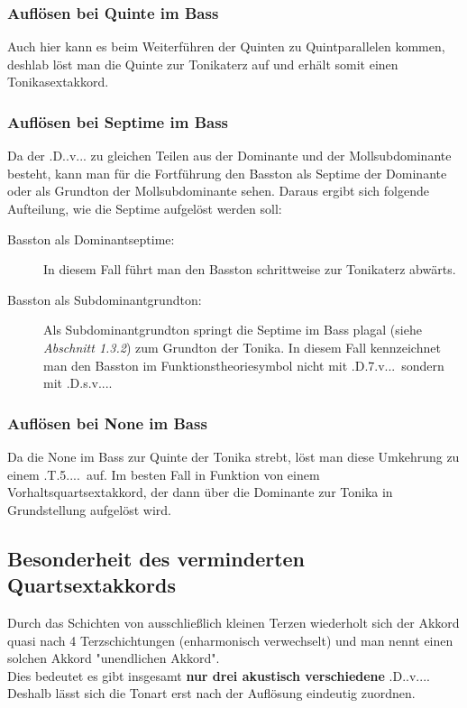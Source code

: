 \documentclass[a4paper]{article}
\newcommand{\TQS}{\HH.T.5....}
\newcommand{\Dhoch}[2]{\HH.D.#2.#1...}
\begin{document}
	\subsubsection{Auflösen bei Quinte im Bass}
	Auch hier kann es beim Weiterführen der Quinten zu Quintparallelen kommen, deshlab löst man die Quinte zur Tonikaterz auf und erhält somit einen Tonikasextakkord.
	
	\subsubsection{Auflösen bei Septime im Bass}
	Da der \Dhoch{v}{} zu gleichen Teilen aus der Dominante und der Mollsubdominante besteht, kann man für die Fortführung den Basston als Septime der Dominante oder als Grundton der Mollsubdominante sehen. Daraus ergibt sich folgende Aufteilung, wie die Septime aufgelöst werden soll:
	\begin{description}
		\item[Basston als Dominantseptime:] In diesem Fall führt man den Basston schrittweise zur Tonikaterz abwärts.
		\item[Basston als Subdominantgrundton:] Als Subdominantgrundton springt die Septime im Bass plagal (siehe \textit{Abschnitt 1.3.2}) zum Grundton der Tonika. In diesem Fall kennzeichnet man den Basston im Funktionstheoriesymbol nicht mit \Dhoch{v}{7}\ sondern mit \Dhoch{v}{s}.
	\end{description}

	\subsubsection{Auflösen bei None im Bass}
	Da die None im Bass zur Quinte der Tonika strebt, löst man diese Umkehrung zu einem \TQS\ auf. Im besten Fall in Funktion von einem Vorhaltsquartsextakkord, der dann über die Dominante zur Tonika in Grundstellung aufgelöst wird.
	
	\subsection{Besonderheit des verminderten Quartsextakkords}
	Durch das Schichten von ausschließlich kleinen Terzen wiederholt sich der Akkord quasi nach 4 Terzschichtungen (enharmonisch verwechselt) und man nennt einen solchen Akkord "{}unendlichen Akkord".\\
	Dies bedeutet es gibt insgesamt \textbf{nur drei akustisch verschiedene} \Dhoch{v}{}.\\
	Deshalb lässt sich die Tonart erst nach der Auflösung eindeutig zuordnen.
	
\end{document}
